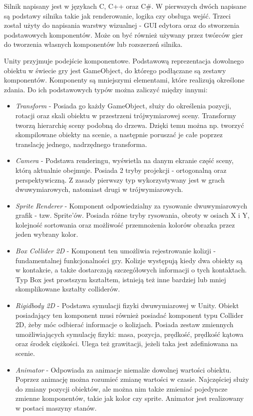\documentclass[a4paper,12pt,twoside,openany]{report}
\begin{document}
Silnik napisany jest w językach C, C++ oraz C\#. W pierwszych dwóch napisane są podstawy silnika takie jak renderowanie, logika czy obsługa wejść. Trzeci został użyty do napisania warstwy wizualnej - GUI edytora oraz do stworzenia podstawowych komponentów. Może on być również używany przez twórców gier do tworzenia własnych komponentów lub rozszerzeń silnika.


Unity przyjmuje podejście komponentowe. Podstawową  reprezentacja dowolnego obiektu w świecie gry jest GameObject, do którego podłączane są zestawy komponentów. Komponenty są mniejszymi elementami, które realizują określone zdania. Do ich podstawowych typów można zaliczyć między innymi:
\begin{itemize}
    \item \textit{Transform} - Posiada go każdy GameObject, służy do określenia pozycji, rotacji oraz skali obiektu w przestrzeni trójwymiarowej sceny. Transformy tworzą hierarchię sceny podobną do drzewa. Dzięki temu można np. tworzyć skompilowane obiekty na scenie, a następnie poruszać je całe poprzez translację jednego, nadrzędnego transforma.
    \item \textit{Camera} - Podstawa renderingu, wyświetla na danym ekranie część sceny, którą aktualnie obejmuje. Posiada 2 tryby projekcji - ortogonalną oraz perspektywiczną. Z zasady pierwszy typ wykorzystywany jest w grach dwuwymiarowych, natomiast drugi w trójwymiarowych.
    \item \textit{Sprite Renderer} - Komponent odpowiedzialny za rysowanie dwuwymiarowych grafik - tzw. Sprite'ów. Posiada różne tryby rysowania, obroty w osiach X i Y, kolejność sortowania oraz możliwość przemnożenia kolorów obrazka przez jeden wybrany kolor.
    \item \textit{Box Collider 2D} - Komponent ten umożliwia rejestrowanie kolizji - fundamentalnej funkcjonalności gry. Kolizje występują kiedy dwa obiekty są w kontakcie, a także dostarczają szczegółowych informacji o tych kontaktach. Typ Box jest prostszym kształtem, istnieją też inne bardziej lub mniej skomplikowane kształty colliderów.
    \item \textit{Rigidbody 2D} - Podstawa symulacji fizyki dwuwymiarowej w Unity. Obiekt posiadający ten komponent musi również posiadać komponent typu Collider 2D, żeby móc odbierać informacje o kolizjach. Posiada zestaw zmiennych umożliwiających symulację fizyki: masa, pozycja, prędkość, prędkość kątowa oraz środek ciężkości. Ulega też grawitacji, jeżeli taka jest zdefiniowana na scenie.
    \item \textit{Animator} - Odpowiada za animacje niemalże dowolnej wartości obiektu. Poprzez animację można rozumieć zmianę wartości w czasie. Najczęściej służy do zmiany pozycji obiektów, ale można nim także zmieniać pojedyncze zmienne komponentów, takie jak kolor czy sprite. Animator jest realizowany w postaci maszyny stanów.

\end{itemize}
\end{document}
